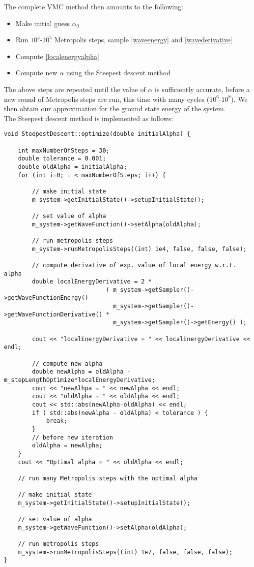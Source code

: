 \documentclass[english, a4paper]{article}
\begin{document}
The complete VMC method then amounts to the following:
\begin{itemize}
 \item Make initial guess $\alpha_0$
 \item Run $10^4$-$10^5$ Metropolis steps, sample \eqref{waveenergy} and \eqref{wavederivative}
 \item Compute \eqref{localenergyalpha} 
 \item Compute new $\alpha$ using the Steepest descent method
\end{itemize}
The above steps are repeated until the value of $\alpha$ is sufficiently accurate, before a new round of
Metropolis steps are run, this time with many cycles ($10^6$-$10^8$). We then obtain our approximation
for the ground state energy of the system.\\

\noindent The Steepest descent method is implemented as follows:
\belowcaptionskip=-10pt
\begin{lstlisting}[label=steepestdescent,caption=The Steepest Descent method]
 void SteepestDescent::optimize(double initialAlpha) {

    int maxNumberOfSteps = 30;
    double tolerance = 0.001;
    double oldAlpha = initialAlpha;
    for (int i=0; i < maxNumberOfSteps; i++) {

        // make initial state
        m_system->getInitialState()->setupInitialState();

        // set value of alpha
        m_system->getWaveFunction()->setAlpha(oldAlpha);

        // run metropolis steps
        m_system->runMetropolisSteps((int) 1e4, false, false, false);

        // compute derivative of exp. value of local energy w.r.t. alpha
        double localEnergyDerivative = 2 * 
                             ( m_system->getSampler()->getWaveFunctionEnergy() -
                               m_system->getSampler()->getWaveFunctionDerivative() *
                               m_system->getSampler()->getEnergy() );

        cout << "localEnergyDerivative = " << localEnergyDerivative << endl;

        // compute new alpha
        double newAlpha = oldAlpha - m_stepLengthOptimize*localEnergyDerivative;
        cout << "newAlhpa = " << newAlpha << endl;
        cout << "oldAlpha = " << oldAlpha << endl;
        cout << std::abs(newAlpha-oldAlpha) << endl;
        if ( std::abs(newAlpha - oldAlpha) < tolerance ) {
            break;
        }
        // before new iteration
        oldAlpha = newAlpha;
    }
    cout << "Optimal alpha = " << oldAlpha << endl;

    // run many Metropolis steps with the optimal alpha

    // make initial state
    m_system->getInitialState()->setupInitialState();

    // set value of alpha
    m_system->getWaveFunction()->setAlpha(oldAlpha);

    // run metropolis steps
    m_system->runMetropolisSteps((int) 1e7, false, false, false);
}
\end{lstlisting}
\end{document}
